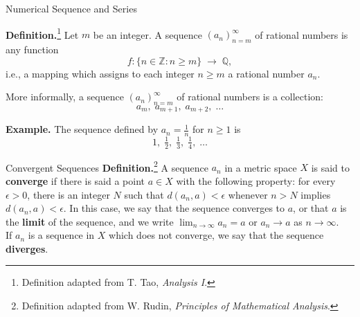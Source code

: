 \documentclass{beamer}
\begin{document}
\begin{frame}{Numerical Sequence and Series}

\textbf{Definition.}\footnote{Definition adapted from T. Tao, \emph{Analysis I}.} Let $m$ be an integer.  
A sequence $(a_n)_{n=m}^{\infty}$ of rational numbers is any function
\[
f: \{ n \in \mathbb{Z} : n \geq m \} \;\to\; \mathbb{Q},
\]
i.e., a mapping which assigns to each integer $n \geq m$ a rational number $a_n$.

\medskip
More informally, a sequence $(a_n)_{n=m}^{\infty}$ of rational numbers is a collection:
\[
a_m, \; a_{m+1}, \; a_{m+2}, \; \dots
\]

\bigskip
\textbf{Example.}  
The sequence defined by $a_n = \tfrac{1}{n}$ for $n \geq 1$ is
\[
1, \; \tfrac{1}{2}, \; \tfrac{1}{3}, \; \tfrac{1}{4}, \; \dots
\]

    
\end{frame}

\begin{frame}{Convergent Sequences}
\textbf{Definition.}\footnote{Definition adapted from W. Rudin, \emph{Principles of Mathematical Analysis}.}
A sequence ${a_n}$ in a metric space $X$ is said to \textbf{converge} if there is said a point $a \in X$ with the following property: for every $\epsilon > 0$, there is an integer $N$ such that $d(a_n, a) < \epsilon$ whenever $n > N$ implies $d(a_n,a)< \epsilon$.  In this case, we say that the sequence converges to $a$, or that $a$ is the \textbf{limit} of the sequence, and we write $\lim_{n \to \infty} a_n = a$ or $a_n \to a$ as $n \to \infty$.\\ 
If ${a_n}$ is a sequence in $X$ which does not converge, we say that the sequence \textbf{diverges}.
\end{frame}
\end{document}
